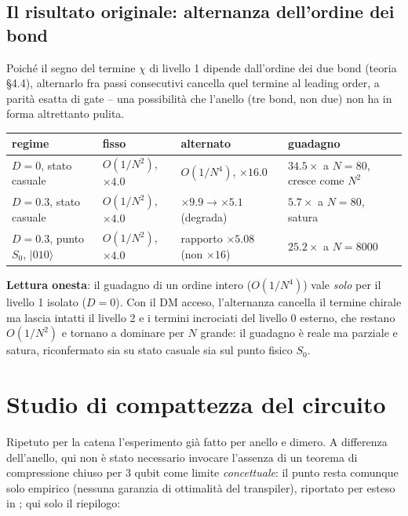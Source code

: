 \documentclass[11pt,a4paper]{article}
\newcommand{\ket}[1]{\lvert #1 \rangle}
\begin{document}
\subsection{Il risultato originale: alternanza dell'ordine dei bond}

Poiché il segno del termine $\chi$ di livello 1 dipende dall'ordine dei due bond (teoria \S4.4), alternarlo fra passi consecutivi cancella quel termine al leading order, a parità esatta di gate -- una possibilità che l'anello (tre bond, non due) non ha in forma altrettanto pulita.

\begin{center}
\small
\begin{tabular}{@{}p{3.4cm}p{2.6cm}p{3.6cm}p{3.6cm}@{}}
\toprule
regime & fisso & alternato & guadagno \\
\midrule
$D=0$, stato casuale & $O(1/N^2)$, $\times4.0$ & $O(1/N^4)$, $\times16.0$ & $34.5\times$ a $N{=}80$, cresce come $N^2$ \\
$D=0.3$, stato casuale & $O(1/N^2)$, $\times4.0$ & $\times9.9\to\times5.1$ (degrada) & $5.7\times$ a $N{=}80$, satura \\
$D=0.3$, punto $S_0$, $\ket{010}$ & $O(1/N^2)$, $\times4.0$ & rapporto $\times5.08$ (non $\times16$) & $25.2\times$ a $N{=}8000$ \\
\bottomrule
\end{tabular}
\end{center}

\textbf{Lettura onesta}: il guadagno di un ordine intero ($O(1/N^4)$) vale \emph{solo} per il livello 1 isolato ($D=0$). Con il DM acceso, l'alternanza cancella il termine chirale ma lascia intatti il livello 2 e i termini incrociati del livello 0 esterno, che restano $O(1/N^2)$ e tornano a dominare per $N$ grande: il guadagno è reale ma parziale e satura, riconfermato sia su stato casuale sia sul punto fisico $S_0$.

\section{Studio di compattezza del circuito}

Ripetuto per la catena l'esperimento già fatto per anello e dimero. A differenza dell'anello, qui non è stato necessario invocare l'assenza di un teorema di compressione chiuso per 3 qubit come limite \emph{concettuale}: il punto resta comunque solo empirico (nessuna garanzia di ottimalità del transpiler), riportato per esteso in \texttt{}; qui solo il riepilogo:
\end{document}
